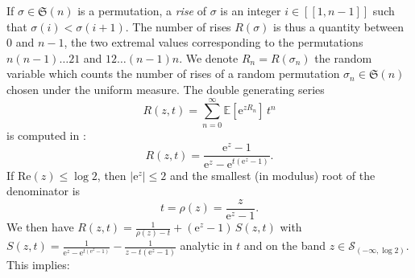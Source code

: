\documentclass[12pt,a4paper,reqno]{amsart}
\theoremstyle{remark}
\def\lle{[\![}
\def\rre{]\!]}
\newcommand{\E}{\mathrm{e}}
\newcommand{\esper}{\mathbb{E}}
\newcommand{\sym}{\mathfrak{S}}
\renewcommand{\Re}{\mathrm{Re}}
\begin{document}
If $\sigma \in \sym(n)$ is a permutation, a \emph{rise} of $\sigma$ is an integer $i \in \lle 1,n-1\rre$ such that $\sigma(i)<\sigma(i+1)$. The number of rises $R(\sigma)$ is thus a quantity between $0$ and $n-1$, the two extremal values corresponding to the permutations $n(n-1)\ldots 2 1$ and $12\ldots (n-1)n$. We denote $R_n=R(\sigma_n)$ the random variable which counts the number of rises of a random permutation $\sigma_n \in \sym(n)$ chosen under the uniform measure. The double generating series
$$R(z,t) = \sum_{n=0}^\infty \esper[\E^{z R_n}]\,t^n$$
is computed in \cite[III.7, p. 209]{FSe09}:
$$R(z,t)=\frac{\E^{z}-1}{\E^z-\E^{t(\E^z-1)}}.$$
If $\Re (z)\leq \log 2$, then $|\E^{z}|\leq 2$ and the smallest (in modulus) root of the denominator is 
$$t=\rho(z)=\frac{z}{\E^z-1}.$$
We then have $R(z,t) = \frac{1}{\rho(z)-t} + (\E^z-1)\,S(z,t)$ with $S(z,t)=\frac{1}{\E^z - \E^{t(\E^z-1)}}-\frac{1}{z-t(\E^z-1)}$ analytic in $t$ and on the band $z \in \mathcal{S}_{(-\infty,\log 2)}$. This implies:
\end{document}
